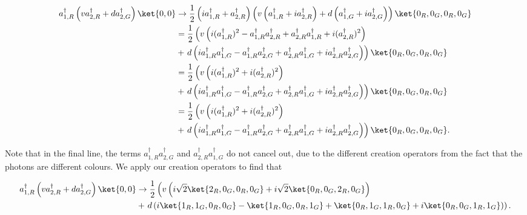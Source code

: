 \begin{align}
a_{1,R}^\dagger\left(v a_{2,R}^\dagger + da_{2,G}^\dagger\right)\ket{0,0} &\rightarrow \frac{1}{2}\left(ia_{1,R}^\dagger + a_{2,R}^\dagger\right)\left(v\left(a_{1,R}^\dagger + ia_{2,R}^\dagger\right) + d\left(a_{1,G}^\dagger + ia_{2,G}^\dagger\right)\right)\ket{0_R,0_G,0_R,0_G}\\
&= \frac{1}{2}\left(v\left(i(a_{1,R}^\dagger)^2 - a_{1,R}^\dagger a_{2,R}^\dagger + a_{2,R}^\dagger a_{1,R}^\dagger+i(a_{2,R}^\dagger)^2\right)\right.\\
&+\left. d\left(ia_{1,R}^\dagger a_{1,G}^\dagger - a_{1,R}^\dagger a_{2,G}^\dagger + a_{2,R}^\dagger a_{1,G}^\dagger+ia_{2,R}^\dagger a_{2,G}^\dagger \right)\right)\ket{0_R,0_G,0_R,0_G}\\
&= \frac{1}{2}\left(v\left(i(a_{1,R}^\dagger)^2 +i(a_{2,R}^\dagger)^2\right)\right.\\
&+\left. d\left(ia_{1,R}^\dagger a_{1,G}^\dagger - a_{1,R}^\dagger a_{2,G}^\dagger + a_{2,R}^\dagger a_{1,G}^\dagger+ia_{2,R}^\dagger a_{2,G}^\dagger \right)\right)\ket{0_R,0_G,0_R,0_G}\\
&= \frac{1}{2}\left(v\left(i(a_{1,R}^\dagger)^2 +i(a_{2,R}^\dagger)^2\right)\right.\nonumber\\
&+\left. d\left(ia_{1,R}^\dagger a_{1,G}^\dagger - a_{1,R}^\dagger a_{2,G}^\dagger + a_{2,R}^\dagger a_{1,G}^\dagger+ia_{2,R}^\dagger a_{2,G}^\dagger \right)\right)\ket{0_R,0_G,0_R,0_G}.
\end{align}

Note that in the final line, the terms $a_{1,R}^\dagger a_{2,G}^\dagger$ and $a_{2,R}^\dagger a_{1,G}^\dagger$ do not cancel out, due to the different creation operators from the fact that the photons are different colours. We apply our creation operators to find that

\begin{align}
a_{1,R}^\dagger\left(v a_{2,R}^\dagger + da_{2,G}^\dagger\right)\ket{0,0} &\rightarrow \frac{1}{2}\left(v\left(i\sqrt{2}\ket{2_R,0_G,0_R,0_G} +i\sqrt{2}\ket{0_R,0_G,2_R,0_G}\right)\right.\nonumber\\
&+\left. d\left(i\ket{1_R,1_G,0_R,0_G} - \ket{1_R,0_G,0_R,1_G} + \ket{0_R,1_G,1_R,0_G}+i\ket{0_R,0_G,1_R,1_G} \right)\right).
\end{align}

